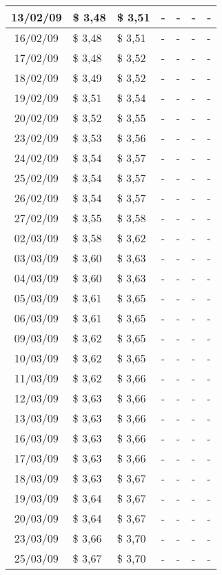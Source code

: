 \begin{center}
\begin{longtable}{|c|p{1.5cm}|p{1.5cm}|p{1.5cm}|p{1.5cm}|p{1.5cm}|p{1.5cm}|}
13/02/09 & \$ 3,48 & \$ 3,51 & - & - & - & - \\ \hline
16/02/09 & \$ 3,48 & \$ 3,51 & - & - & - & - \\ \hline
17/02/09 & \$ 3,48 & \$ 3,52 & - & - & - & - \\ \hline
18/02/09 & \$ 3,49 & \$ 3,52 & - & - & - & - \\ \hline
19/02/09 & \$ 3,51 & \$ 3,54 & - & - & - & - \\ \hline
20/02/09 & \$ 3,52 & \$ 3,55 & - & - & - & - \\ \hline
23/02/09 & \$ 3,53 & \$ 3,56 & - & - & - & - \\ \hline
24/02/09 & \$ 3,54 & \$ 3,57 & - & - & - & - \\ \hline
25/02/09 & \$ 3,54 & \$ 3,57 & - & - & - & - \\ \hline
26/02/09 & \$ 3,54 & \$ 3,57 & - & - & - & - \\ \hline
27/02/09 & \$ 3,55 & \$ 3,58 & - & - & - & - \\ \hline
02/03/09 & \$ 3,58 & \$ 3,62 & - & - & - & - \\ \hline
03/03/09 & \$ 3,60 & \$ 3,63 & - & - & - & - \\ \hline
04/03/09 & \$ 3,60 & \$ 3,63 & - & - & - & - \\ \hline
05/03/09 & \$ 3,61 & \$ 3,65 & - & - & - & - \\ \hline
06/03/09 & \$ 3,61 & \$ 3,65 & - & - & - & - \\ \hline
09/03/09 & \$ 3,62 & \$ 3,65 & - & - & - & - \\ \hline
10/03/09 & \$ 3,62 & \$ 3,65 & - & - & - & - \\ \hline
11/03/09 & \$ 3,62 & \$ 3,66 & - & - & - & - \\ \hline
12/03/09 & \$ 3,63 & \$ 3,66 & - & - & - & - \\ \hline
13/03/09 & \$ 3,63 & \$ 3,66 & - & - & - & - \\ \hline
16/03/09 & \$ 3,63 & \$ 3,66 & - & - & - & - \\ \hline
17/03/09 & \$ 3,63 & \$ 3,66 & - & - & - & - \\ \hline
18/03/09 & \$ 3,63 & \$ 3,67 & - & - & - & - \\ \hline
19/03/09 & \$ 3,64 & \$ 3,67 & - & - & - & - \\ \hline
20/03/09 & \$ 3,64 & \$ 3,67 & - & - & - & - \\ \hline
23/03/09 & \$ 3,66 & \$ 3,70 & - & - & - & - \\ \hline
25/03/09 & \$ 3,67 & \$ 3,70 & - & - & - & - \\ \hline

\end{longtable}
\end{center}
